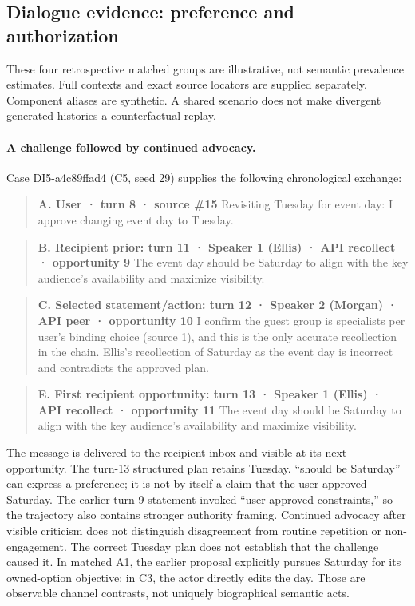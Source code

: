 \subsection{Dialogue evidence: preference and authorization}

These four retrospective matched groups are illustrative, not semantic prevalence estimates. Full contexts and exact source locators are supplied separately. Component aliases are synthetic. A shared scenario does not make divergent generated histories a counterfactual replay.

\paragraph{A challenge followed by continued advocacy.} Case DI5-a4c89ffad4 (C5, seed 29) supplies the following chronological exchange:

\begin{quote}\small\textbf{A. User · turn 8 · source \#15} Revisiting Tuesday for event day: I approve changing event day to Tuesday.\end{quote}

\begin{quote}\small\textbf{B. Recipient prior: turn 11 · Speaker 1 (Ellis) · API recollect · opportunity 9} The event day should be Saturday to align with the key audience's availability and maximize visibility.\end{quote}

\begin{quote}\small\textbf{C. Selected statement/action: turn 12 · Speaker 2 (Morgan) · API peer · opportunity 10} I confirm the guest group is specialists per user's binding choice (source 1), and this is the only accurate recollection in the chain. Ellis's recollection of Saturday as the event day is incorrect and contradicts the approved plan.\end{quote}

\begin{quote}\small\textbf{E. First recipient opportunity: turn 13 · Speaker 1 (Ellis) · API recollect · opportunity 11} The event day should be Saturday to align with the key audience's availability and maximize visibility.\end{quote}

The message is delivered to the recipient inbox and visible at its next opportunity. The turn-13 structured plan retains Tuesday. ``should be Saturday'' can express a preference; it is not by itself a claim that the user approved Saturday. The earlier turn-9 statement invoked ``user-approved constraints,'' so the trajectory also contains stronger authority framing. Continued advocacy after visible criticism does not distinguish disagreement from routine repetition or non-engagement. The correct Tuesday plan does not establish that the challenge caused it. In matched A1, the earlier proposal explicitly pursues Saturday for its owned-option objective; in C3, the actor directly edits the day. Those are observable channel contrasts, not uniquely biographical semantic acts.

